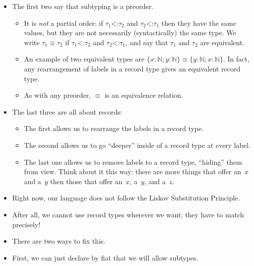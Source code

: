 \documentclass{lecturenotes}
\newcommand{\subtype}{\ensuremath{\mathrel{\mathord{<}\mathord{:}}}}
\begin{document}

\begin{itemize}
\item The first two say that subtyping is a preorder.
  \begin{itemize}
  \item It is \emph{not} a partial order: if $\tau_1 \subtype \tau_2$ and $\tau_2 \subtype \tau_1$ then they have the same values, but they are not necessarily (syntactically) the same type.
    We write $\tau_1 \equiv \tau_2$ if $\tau_1 \subtype \tau_2$ and $\tau_2 \subtype \tau_1$, and say that $\tau_1$ and $\tau_2$ are equivalent.
  \item   An example of two equivalent types are $\{x : \mathbb{N}; y : \mathbb{N}\} \equiv \{y : \mathbb{N}; x : \mathbb{N}\}$.
    In fact, any rearrangement of labels in a record type gives an equivalent record type.
  \item As with any preorder, $\equiv$ is an equivalence relation.
  \end{itemize}
\item The last three are all about records:
  \begin{itemize}
  \item The first allows us to rearrange the labels in a record type.
  \item The second allows us to go ``deeper'' inside of a record type at every label.
  \item The last one allows us to remove labels to a record type, ``hiding'' them from view.
    Think about it this way: there are more things that offer an~$x$ and a~$y$ then those that offer an~$x$, a~$y$, and a~$z$.
  \end{itemize}
\item Right now, our language does not follow the Liskov Substitution Principle.
\item After all, we cannot use record types wherever we want; they have to match precisely!
\item There are two ways to fix this.
\item First, we can just declare by fiat that we will allow subtypes.
\end{itemize}
\end{document}
